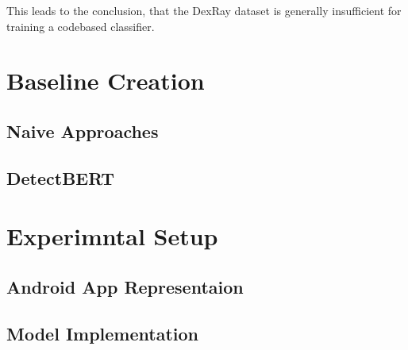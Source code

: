 This leads to the conclusion, that the DexRay dataset is generally insufficient for training a codebased classifier.


\section{Baseline Creation}

\subsection{Naive Approaches}

\subsection{DetectBERT}

\section{Experimntal Setup}

\subsection{Android App Representaion}

\subsection{Model Implementation}

